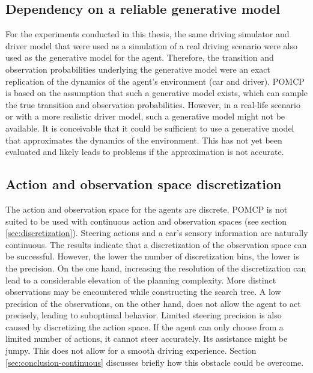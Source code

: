 \subsection{Dependency on a reliable generative model}

For the experiments conducted in this thesis, the same driving simulator and driver model that were used as a simulation of a real driving scenario were also used as the generative model for the agent. Therefore, the transition and observation probabilities underlying the generative model were an exact replication of the dynamics of the agent's environment (car and driver). POMCP is based on the assumption that such a generative model exists, which can sample the true transition and observation probabilities. However, in a real-life scenario or with a more realistic driver model, such a generative model might not be available. It is conceivable that it could be sufficient to use a generative model that approximates the dynamics of the environment. This has not yet been evaluated and likely leads to problems if the approximation is not accurate.

\subsection{Action and observation space discretization}

The action and observation space for the agents are discrete. POMCP is not suited to be used with continuous action and observation spaces (see section \ref{sec:discretization}). Steering actions and a car's sensory information are naturally continuous. The results indicate that a discretization of the observation space can be successful. However, the lower the number of discretization bins, the lower is the precision. On the one hand, increasing the resolution of the discretization can lead to a considerable elevation of the planning complexity. More distinct observations may be encountered while constructing the search tree. A low precision of the observations, on the other hand, does not allow the agent to act precisely, leading to suboptimal behavior. Limited steering precision is also caused by discretizing the action space. If the agent can only choose from a limited number of actions, it cannot steer accurately. Its assistance might be jumpy. This does not allow for a smooth driving experience. Section \ref{sec:conclusion-continuous} discusses briefly how this obstacle could be overcome. 

